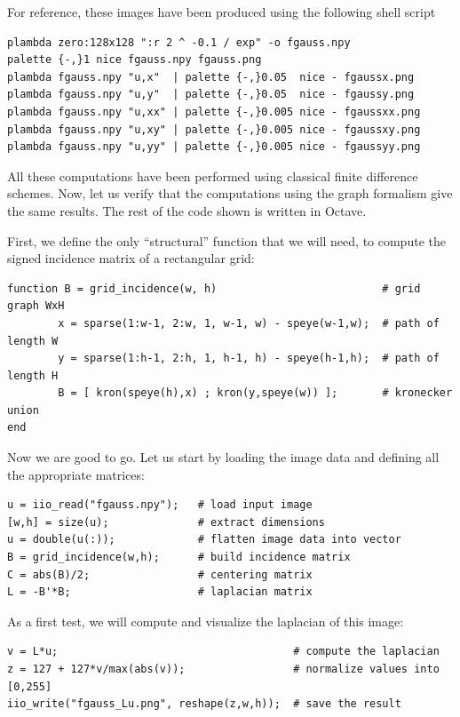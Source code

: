 For reference, these images have been produced using the following shell
script
 \begin{verbatim}
plambda zero:128x128 ":r 2 ^ -0.1 / exp" -o fgauss.npy
palette {-,}1 nice fgauss.npy fgauss.png
plambda fgauss.npy "u,x"  | palette {-,}0.05  nice - fgaussx.png
plambda fgauss.npy "u,y"  | palette {-,}0.05  nice - fgaussy.png
plambda fgauss.npy "u,xx" | palette {-,}0.005 nice - fgaussxx.png
plambda fgauss.npy "u,xy" | palette {-,}0.005 nice - fgaussxy.png
plambda fgauss.npy "u,yy" | palette {-,}0.005 nice - fgaussyy.png
\end{verbatim}%


All these computations have been performed using classical finite difference
schemes.  Now, let us verify that the computations using the graph
formalism give the same results.  The rest of the code shown is written in
Octave.


First, we define the only ``structural'' function that we will need, to
compute the signed incidence matrix of a rectangular grid:

\begin{verbatim}
function B = grid_incidence(w, h)                          # grid graph WxH
        x = sparse(1:w-1, 2:w, 1, w-1, w) - speye(w-1,w);  # path of length W
        y = sparse(1:h-1, 2:h, 1, h-1, h) - speye(h-1,h);  # path of length H
        B = [ kron(speye(h),x) ; kron(y,speye(w)) ];       # kronecker union
end
\end{verbatim}

Now we are good to go.  Let us start by loading the image data and defining
all the appropriate matrices:

\begin{verbatim}
u = iio_read("fgauss.npy");   # load input image
[w,h] = size(u);              # extract dimensions
u = double(u(:));             # flatten image data into vector
B = grid_incidence(w,h);      # build incidence matrix
C = abs(B)/2;                 # centering matrix
L = -B'*B;                    # laplacian matrix
\end{verbatim}

As a first test, we will compute and visualize the laplacian of this image:
\begin{verbatim}
v = L*u;                                     # compute the laplacian
z = 127 + 127*v/max(abs(v));                 # normalize values into [0,255]
iio_write("fgauss_Lu.png", reshape(z,w,h));  # save the result
\end{verbatim}

